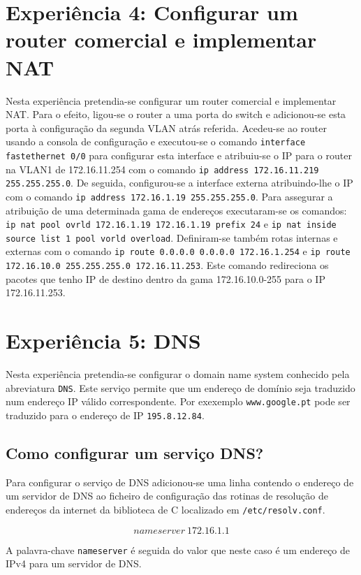 \documentclass[a4paper,11pt,titlepage]{article}
\begin{document}
\section{Experiência 4: Configurar um router comercial e implementar NAT}
Nesta experiência pretendia-se configurar um router comercial e implementar NAT. Para o efeito, ligou-se o router a uma porta do switch e adicionou-se esta porta à configuração da segunda VLAN atrás referida. Acedeu-se ao router usando a consola de configuração e executou-se o comando \texttt{interface fastethernet 0/0} para configurar esta interface e atribuiu-se o IP para o router na VLAN1 de 172.16.11.254 com o comando \texttt{ip address 172.16.11.219 255.255.255.0}. De seguida, configurou-se a interface externa atribuindo-lhe o IP com o comando \texttt{ip address 172.16.1.19 255.255.255.0}. Para assegurar a atribuição de uma determinada gama de endereços executaram-se os comandos: \texttt{ip nat pool ovrld 172.16.1.19 172.16.1.19 prefix 24} e \texttt{ip nat inside source list 1 pool vorld overload}. Definiram-se também rotas internas e externas com o comando \texttt{ip route 0.0.0.0 0.0.0.0 172.16.1.254} e \texttt{ip route 172.16.10.0 255.255.255.0 172.16.11.253}. Este comando redireciona os pacotes que tenho IP de destino dentro da gama 172.16.10.0-255 para o IP 172.16.11.253.

\section{Experiência 5: DNS}
Nesta experiência pretendia-se configurar o domain name system conhecido pela abreviatura \texttt{DNS}. Este serviço permite que um endereço de domínio seja traduzido num endereço IP válido correspondente. Por exexemplo \texttt{www.google.pt} pode ser traduzido para o endereço de IP \texttt{195.8.12.84}.

\subsection{Como configurar um serviço DNS?}
Para configurar o serviço de DNS adicionou-se uma linha contendo o endereço de um servidor de DNS ao ficheiro de configuração das rotinas de resolução de endereços da internet da biblioteca de C localizado em \texttt{/etc/resolv.conf}.

$$nameserver\ 172.16.1.1$$

A palavra-chave \texttt{nameserver} é seguida do valor que neste caso é um endereço de IPv4 para um servidor de DNS.
\end{document}
